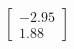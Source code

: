 \documentclass[preview]{standalone}
\begin{document}
\begin{align*}
\begin{bmatrix} -2.95 \\ 1.88 \end{bmatrix}
\end{align*}
\end{document}
